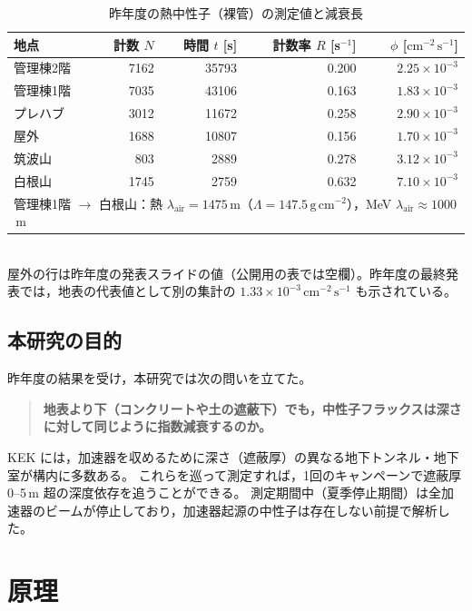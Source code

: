 \documentclass[a4paper,11pt]{ltjsarticle}
\newcommand{\flux}{\mathrm{cm^{-2}\,s^{-1}}}
\newcommand{\gcm}{\mathrm{g\,cm^{-2}}}
\begin{document}
\begin{table}[htbp]
  \centering
  \caption{昨年度の熱中性子（裸管）の測定値と減衰長\cite{lastyear}}
  \label{tab:lastyear}
  \begin{tabular}{lrrrr}
    \toprule
    地点 & 計数 $N$ & 時間 $t$ [s] & 計数率 $R$ [s$^{-1}$] & $\phi$ [$\flux$] \\
    \midrule
    管理棟2階 & 7162 & 35793 & 0.200 & $2.25\times10^{-3}$ \\
    管理棟1階 & 7035 & 43106 & 0.163 & $1.83\times10^{-3}$ \\
    プレハブ   & 3012 & 11672 & 0.258 & $2.90\times10^{-3}$ \\
    屋外      & 1688 & 10807 & 0.156 & $1.70\times10^{-3}$ \\
    筑波山    &  803 &  2889 & 0.278 & $3.12\times10^{-3}$ \\
    白根山    & 1745 &  2759 & 0.632 & $7.10\times10^{-3}$ \\
    \midrule
    \multicolumn{5}{l}{管理棟1階 $\to$ 白根山：熱 $\lambda_{\mathrm{air}}=1475$\,m（$\Lambda=147.5\,\gcm$），MeV $\lambda_{\mathrm{air}}\approx1000$\,m} \\
    \bottomrule
  \end{tabular}\\[2pt]
  \footnotesize 屋外の行は昨年度の発表スライドの値（公開用の表では空欄）。昨年度の最終発表では，地表の代表値として別の集計の $1.33\times10^{-3}\,\flux$ も示されている。
\end{table}

\subsection{本研究の目的}

昨年度の結果を受け，本研究では次の問いを立てた。

\begin{quote}
  \textbf{地表より下（コンクリートや土の遮蔽下）でも，中性子フラックスは深さに対して同じように指数減衰するのか。}
\end{quote}

KEK には，加速器を収めるために深さ（遮蔽厚）の異なる地下トンネル・地下室が構内に多数ある。
これらを巡って測定すれば，1回のキャンペーンで遮蔽厚 0--5\,m 超の深度依存を追うことができる。
測定期間中（夏季停止期間）は全加速器のビームが停止しており，加速器起源の中性子は存在しない前提で解析した。

\section{原理}
\end{document}

